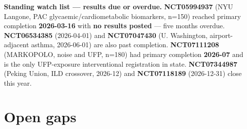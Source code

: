\documentclass[10pt]{article}
\begin{document}
\vspace{2mm}
\textbf{Standing watch list --- results due or overdue.} \textbf{NCT05994937}
(NYU Langone, PAC glycaemic/cardiometabolic biomarkers, n=150) reached primary completion
\textbf{2026-03-16} with \textbf{no results posted} --- five months overdue.
\textbf{NCT06534385} (2026-04-01) and \textbf{NCT07047430} (U. Washington, airport-adjacent
asthma, 2026-06-01) are also past completion. \textbf{NCT07111208} (MARKOPOLO, noise and
UFP, n=180) had primary completion \textbf{2026-07} and is the only UFP-exposure
interventional registration in state. \textbf{NCT07344987} (Peking Union, ILD crossover,
2026-12) and \textbf{NCT07118189} (2026-12-31) close this year.

\clearpage

\section*{\sffamily\bfseries\color{Deep}Open gaps}
\vspace{-1.5mm}{\color{Teal}\rule{\linewidth}{1.1pt}}\vspace{2.5mm}
\end{document}
